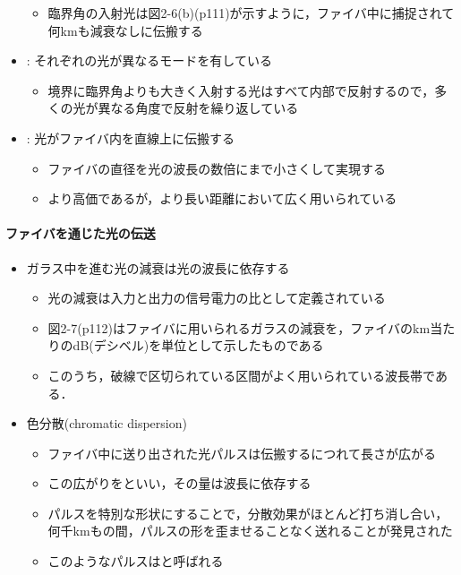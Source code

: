\documentclass[a4paper]{ltjsarticle}
\begin{document}
\begin{itemize}
\begin{itemize}
					\item 臨界角の入射光は図2-6(b)(p111)が示すように，ファイバ中に捕捉されて何kmも減衰なしに伝搬する
				\end{itemize}
				\item {} : それぞれの光が異なるモードを有している
				\begin{itemize}
					\item 境界に臨界角よりも大きく入射する光はすべて内部で反射するので，多くの光が異なる角度で反射を繰り返している
				\end{itemize}
				\item {} : 光がファイバ内を直線上に伝搬する
				\begin{itemize}
					\item ファイバの直径を光の波長の数倍にまで小さくして実現する
					\item より高価であるが，より長い距離において広く用いられている
				\end{itemize}
			\end{itemize}
			\paragraph{ファイバを通じた光の伝送}
				\begin{itemize}
					\item ガラス中を進む光の減衰は光の波長に依存する
					\begin{itemize}
						\item 光の減衰は入力と出力の信号電力の比として定義されている
						\item 図2-7(p112)はファイバに用いられるガラスの減衰を，ファイバの\si{km}当たりの\si{dB}(デシベル)を単位として示したものである
						\item このうち，破線で区切られている区間がよく用いられている波長帯である．
					\end{itemize}
					\item 色分散(chromatic dispersion)
					\begin{itemize}
						\item ファイバ中に送り出された光パルスは伝搬するにつれて長さが広がる
						\item この広がりをといい，その量は波長に依存する
						\item パルスを特別な形状にすることで，分散効果がほとんど打ち消し合い，何千kmもの間，パルスの形を歪ませることなく送れることが発見された
						\item このようなパルスはと呼ばれる
					\end{itemize}
				\end{itemize}
\end{document}
